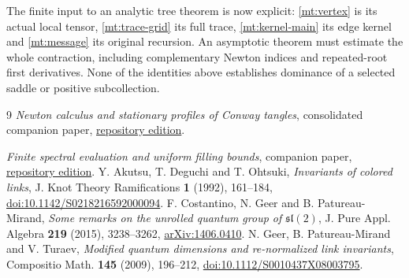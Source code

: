 \documentclass[11pt]{article}
\numberwithin{equation}{section}
\theoremstyle{definition}\newtheorem{definition}[theorem]{Definition}
\theoremstyle{remark}\newtheorem{remark}[theorem]{Remark}
\begin{document}
The finite input to an analytic tree theorem is now explicit:
\eqref{mt:vertex} is its actual local tensor,
\eqref{mt:trace-grid} its full trace,
\eqref{mt:kernel-main} its edge kernel and
\eqref{mt:message} its original recursion. An asymptotic theorem
must estimate the whole contraction, including complementary
Newton indices and repeated-root first derivatives. None of the identities
above establishes dominance of a selected saddle or positive
subcollection.

\begin{thebibliography}{9}
\emph{Newton calculus and stationary profiles of Conway tangles},
consolidated companion paper,
\href{https://sashakolpakov.github.io/murakamis_dream/papers/newton-calculus.pdf}{repository edition}.

 \emph{Finite spectral evaluation and uniform filling bounds},
companion paper, \href{https://sashakolpakov.github.io/murakamis_dream/papers/filling-bounds.pdf}{repository edition}.
 Y. Akutsu, T. Deguchi and T. Ohtsuki,
\emph{Invariants of colored links}, J. Knot Theory Ramifications
\textbf{1} (1992), 161--184,
\href{https://doi.org/10.1142/S0218216592000094}{doi:10.1142/S0218216592000094}.
 F. Costantino, N. Geer and B. Patureau-Mirand,
\emph{Some remarks on the unrolled quantum group of $\mathfrak{sl}(2)$},
J. Pure Appl. Algebra \textbf{219} (2015), 3238--3262,
\href{https://arxiv.org/abs/1406.0410}{arXiv:1406.0410}.
 N. Geer, B. Patureau-Mirand and V. Turaev,
\emph{Modified quantum dimensions and re-normalized link invariants},
Compositio Math. \textbf{145} (2009), 196--212,
\href{https://doi.org/10.1112/S0010437X08003795}{doi:10.1112/S0010437X08003795}.
\end{thebibliography}
\end{document}
